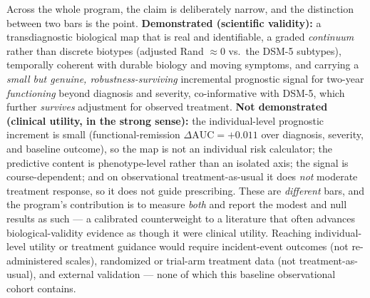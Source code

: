 \begin{openbox}
Across the whole program, the claim is deliberately narrow, and the distinction between two bars is
the point. \textbf{Demonstrated (scientific validity):} a transdiagnostic biological map that is real and
identifiable, a graded \emph{continuum} rather than discrete biotypes (adjusted Rand $\approx 0$
vs.\ the DSM-5 subtypes), temporally coherent with durable biology and moving symptoms, and carrying a
\emph{small but genuine, robustness-surviving} incremental prognostic signal for two-year \emph{functioning}
beyond diagnosis and severity, co-informative with DSM-5, which further \emph{survives} adjustment for
observed treatment. \textbf{Not demonstrated (clinical utility, in the strong sense):} the individual-level
prognostic increment is small (functional-remission $\Delta\text{AUC}=+0.011$ over diagnosis, severity, and baseline outcome), so
the map is not an individual risk calculator; the predictive content is phenotype-level rather than an
isolated axis; the signal is course-dependent; and on observational treatment-as-usual it does \emph{not}
moderate treatment response, so it does not guide prescribing. These are \emph{different} bars, and the
program's contribution is to measure \emph{both} and report the modest and null results as such --- a
calibrated counterweight to a literature that often advances biological-validity evidence as though it were
clinical utility. Reaching individual-level utility or treatment guidance would require incident-event
outcomes (not re-administered scales), randomized or trial-arm treatment data (not treatment-as-usual), and
external validation --- none of which this baseline observational cohort contains.
\end{openbox}
